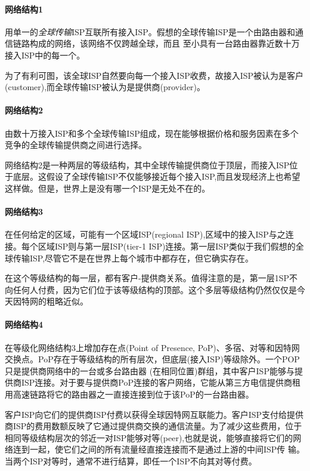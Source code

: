 \paragraph{网络结构1} 用单一的\emph{全球传输}ISP互联所有接入ISP。假想的全球传输ISP是一个由路由器和通信链路构成的网络，该网络不仅跨越全球，而且 至小具有一台路由器靠近数十万接入ISP中的每一个。

    为了有利可图，该全球ISP自然要向每一个接入ISP收费，故接入ISP被认为是客户(customer),而全球传输ISP被认为是提供商(provider)。

\paragraph{网络结构2} 由数十万接入ISP和多个全球传输ISP组成，现在能够根据价格和服务因素在多个竞争的全球传输提供商之间进行选择。

    网络结构2是一种两层的等级结构，其中全球传输提供商位于顶层，而接入ISP位于底层。这假设了全球传输ISP不仅能够接近每个接入ISP,而且发现经济上也希望这样做。但是，世界上是没有哪一个ISP是无处不在的。

\paragraph{网络结构3} 在任何给定的区域，可能有一个区域ISP(regional ISP),区域中的接入ISP与之连接。每个区域ISP则与第一层ISP(tier-1 ISP)连接。第一层ISP类似于我们假想的全球传输ISP,尽管它不是在世界上每个城市中都存在，但它确实存在。

    在这个等级结构的每一层，都有客户-提供商关系。值得注意的是，第一层1SP不向任何人付费，因为它们位于该等级结构的顶部。这个多层等级结构仍然仅仅是今天因特网的粗略近似。

\paragraph{网络结构4} 在等级化网络结构3上增加存在点(Point of Presence, PoP)、多宿、对等和因特网交换点。PoP存在于等级结构的所有层次，但底层(接入ISP)等级除外。一个POP只是提供商网络中的一台或多台路由器 (在相同位置)群组，其中客户ISP能够与提供商ISP连接。对于要与提供商PoP连接的客户网络，它能从第三方电信提供商租用高速链路将它的路由器之一直接连接到位于该PoP的一台路由器。

    客户ISP向它们的提供商ISP付费以获得全球因特网互联能力。客户ISP支付给提供商ISP的费用数额反映了它通过提供商交换的通信流量。为了减少这些费用，位于相同等级结构层次的邻近一对ISP能够对等(peer),也就是说，能够直接将它们的网络连到一起，使它们之间的所有流量经直接连接而不是通过上游的中间ISP传 输。当两个ISP对等时，通常不进行结算，即任一个ISP不向其对等付费。


